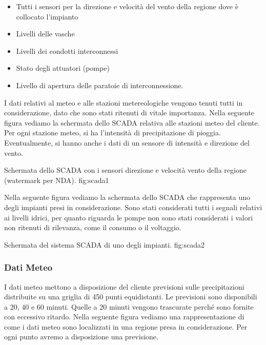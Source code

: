 \begin{itemize}
	\item Tutti i sensori per la direzione e velocità del vento della regione dove è collocato l’impianto
	\item Livelli delle vasche
	\item Livelli dei condotti interconnessi
	\item Stato degli attuatori (pompe)
	\item Livello di apertura delle paratoie di interconnessione. 
\end{itemize}
 I dati relativi al meteo e alle stazioni metereologiche vengono tenuti tutti in considerazione, dato che sono stati ritenuti di vitale importanza.
Nella seguente figura vediamo la schermata dello SCADA relativa alle stazioni meteo del cliente. Per ogni stazione meteo, si ha l’intensità di precipitazione di pioggia. Eventualmente, si hanno anche i dati di un sensore di intensità e direzione del vento.

{Schermata dello SCADA con i sensori direzione e velocità vento della regione (watermark per NDA).}
{fig:scada1}

Nella seguente figura vediamo la schermata dello SCADA che rappresenta uno degli impianti presi in considerazione. Sono stati considerati tutti i segnali relativi ai livelli idrici, per quanto riguarda le pompe non sono stati considerati i valori non ritenuti di rilevanza, come il consumo o il voltaggio.

{Schermata del sistema SCADA di uno degli impianti.}
{fig:scada2}
\subsubsection{Dati Meteo}\label{sectionmeteo}
I dati meteo mettono a disposizione del cliente previsioni sulle precipitazioni distribuite su una griglia di 450 punti equidistanti. Le previsioni sono disponibili a 20, 40 e 60 minuti. Quelle a 20 minuti vengono trascurate perché sono fornite con eccessivo ritardo. Nella seguente figura vediamo una rappresentazione di come i dati meteo sono localizzati in una regione presa in considerazione. Per ogni punto avremo a disposizione una previsione.

